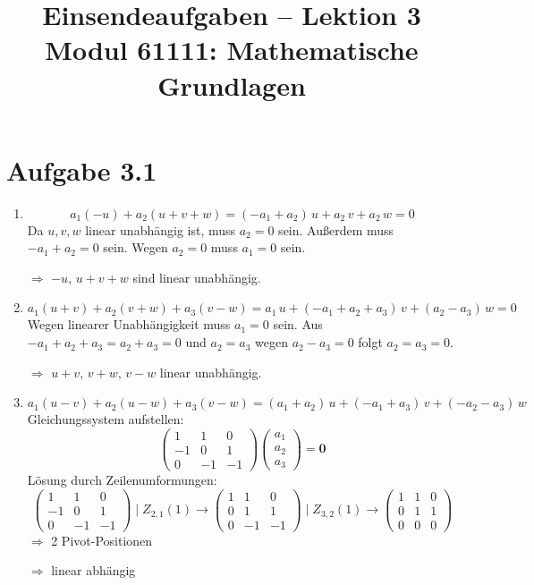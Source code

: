 \documentclass[a4paper,12pt]{article}
\title{Einsendeaufgaben -- Lektion 3\\[0.5em]
\large Modul 61111: Mathematische Grundlagen}
\author{}
\date{}
\begin{document}
\maketitle

\section*{Aufgabe 3.1}

\begin{enumerate}[label=\alph*)]

    \item
    \[
        a_1(-u) + a_2(u+v+w)
        = (-a_1+a_2)\,u + a_2\,v + a_2\,w = 0
    \]
    Da $u,v,w$ linear unabhängig ist, muss $a_2 = 0$ sein.
    Außerdem muss $-a_1+a_2 = 0$ sein. Wegen $a_2 = 0$
    muss $a_1 = 0$ sein.

    $\Rightarrow$ $-u$, $u+v+w$ sind linear unabhängig.

    \item
    \[
        a_1(u+v) + a_2(v+w) + a_3(v-w)
        = a_1\,u + (-a_1+a_2+a_3)\,v + (a_2-a_3)\,w
        = 0
    \]
    Wegen linearer Unabhängigkeit muss $a_1 = 0$ sein.
    Aus $-a_1+a_2+a_3 = a_2+a_3 = 0$
    und $a_2 = a_3$ wegen $a_2-a_3 = 0$
    folgt $a_2 = a_3 = 0$.

    $\Rightarrow$ $u+v$, $v+w$, $v-w$ linear unabhängig.

    \item
    \[
        a_1(u-v) + a_2(u-w) + a_3(v-w)
        = (a_1+a_2)\,u + (-a_1+a_3)\,v + (-a_2-a_3)\,w
    \]
    Gleichungssystem aufstellen:
    \[
        \begin{pmatrix} 1 & 1 & 0 \\ -1 & 0 & 1 \\ 0 & -1 & -1 \end{pmatrix}
        \begin{pmatrix} a_1 \\ a_2 \\ a_3 \end{pmatrix} = \mathbf{0}
    \]
    L\"{o}sung durch Zeilenumformungen:
    \[
        \begin{pmatrix} 1 & 1 & 0 \\ -1 & 0 & 1 \\ 0 & -1 & -1 \end{pmatrix}
        \;\Big|\; Z_{2,1}(1)
        \longrightarrow
        \begin{pmatrix} 1 & 1 & 0 \\ 0 & 1 & 1 \\ 0 & -1 & -1 \end{pmatrix}
        \;\Big|\; Z_{3,2}(1)
        \longrightarrow
        \begin{pmatrix} 1 & 1 & 0 \\ 0 & 1 & 1 \\ 0 & 0 & 0 \end{pmatrix}
    \]
    $\Rightarrow$ 2 Pivot-Positionen

    $\Rightarrow$ linear abhängig

\end{enumerate}
\end{document}
